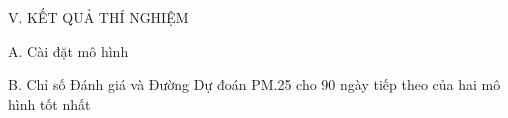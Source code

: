 \begin{center}
    V. KẾT QUẢ THÍ NGHIỆM
\end{center}
A. Cài đặt mô hình

% 
% 
% 
% 
% 
% 
% 
% 
% 
% 
B. Chỉ số Đánh giá và Đường Dự đoán PM.25 cho 90 ngày tiếp theo của hai mô hình tốt nhất















